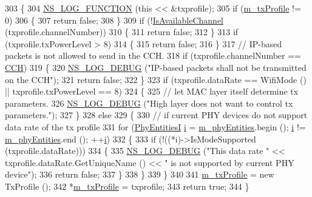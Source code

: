 \begin{DoxyCode}
303 \{
304   \hyperlink{log-macros-disabled_8h_a90b90d5bad1f39cb1b64923ea94c0761}{NS\_LOG\_FUNCTION} (\textcolor{keyword}{this} << &txprofile);
305   \textcolor{keywordflow}{if} (\hyperlink{classns3_1_1WaveNetDevice_ac541d171fef0d8f5c070e305a3e02bca}{m\_txProfile} != 0)
306     \{
307       \textcolor{keywordflow}{return} \textcolor{keyword}{false};
308     \}
309   \textcolor{keywordflow}{if} (!\hyperlink{classns3_1_1WaveNetDevice_a56b63f50ec806a4a50397aa8ac4d6231}{IsAvailableChannel} (txprofile.channelNumber))
310     \{
311       \textcolor{keywordflow}{return} \textcolor{keyword}{false};
312     \}
313   \textcolor{keywordflow}{if} (txprofile.txPowerLevel > 8)
314     \{
315       \textcolor{keywordflow}{return} \textcolor{keyword}{false};
316     \}
317   \textcolor{comment}{// IP-based packets is not allowed to send in the CCH.}
318   \textcolor{keywordflow}{if} (txprofile.channelNumber == \hyperlink{channel-manager_8h_a52d2f169cde2f6abe66ecc83f0d7ad80}{CCH})
319     \{
320       \hyperlink{group__logging_ga413f1886406d49f59a6a0a89b77b4d0a}{NS\_LOG\_DEBUG} (\textcolor{stringliteral}{"IP-based packets shall not be transmitted on the CCH"});
321       \textcolor{keywordflow}{return} \textcolor{keyword}{false};
322     \}
323   \textcolor{keywordflow}{if}  (txprofile.dataRate == WifiMode () || txprofile.txPowerLevel == 8)
324     \{
325       \textcolor{comment}{// let MAC layer itself determine tx parameters.}
326       \hyperlink{group__logging_ga413f1886406d49f59a6a0a89b77b4d0a}{NS\_LOG\_DEBUG} (\textcolor{stringliteral}{"High layer does not want to control tx parameters."});
327     \}
328   \textcolor{keywordflow}{else}
329     \{
330       \textcolor{comment}{// if current PHY devices do not support data rate of the tx profile}
331       \textcolor{keywordflow}{for} (\hyperlink{classns3_1_1WaveNetDevice_ab7544e360cf30da8b42e84caf14c8e8a}{PhyEntitiesI} \hyperlink{bernuolliDistribution_8m_a6f6ccfcf58b31cb6412107d9d5281426}{i} = \hyperlink{classns3_1_1WaveNetDevice_a60401868abeed63f3218b78c076534a8}{m\_phyEntities}.begin (); \hyperlink{bernuolliDistribution_8m_a6f6ccfcf58b31cb6412107d9d5281426}{i} != 
      \hyperlink{classns3_1_1WaveNetDevice_a60401868abeed63f3218b78c076534a8}{m\_phyEntities}.end (); ++\hyperlink{bernuolliDistribution_8m_a6f6ccfcf58b31cb6412107d9d5281426}{i})
332         \{
333           \textcolor{keywordflow}{if} (!((*i)->IsModeSupported (txprofile.dataRate)))
334             \{
335               \hyperlink{group__logging_ga413f1886406d49f59a6a0a89b77b4d0a}{NS\_LOG\_DEBUG} (\textcolor{stringliteral}{"This data rate "} << txprofile.dataRate.GetUniqueName () << \textcolor{stringliteral}{" is
       not supported by current PHY device"});
336               \textcolor{keywordflow}{return} \textcolor{keyword}{false};
337             \}
338         \}
339     \}
340 
341   \hyperlink{classns3_1_1WaveNetDevice_ac541d171fef0d8f5c070e305a3e02bca}{m\_txProfile} = \textcolor{keyword}{new} TxProfile ();
342   *\hyperlink{classns3_1_1WaveNetDevice_ac541d171fef0d8f5c070e305a3e02bca}{m\_txProfile} = txprofile;
343   \textcolor{keywordflow}{return} \textcolor{keyword}{true};
344 \}
\end{DoxyCode}


